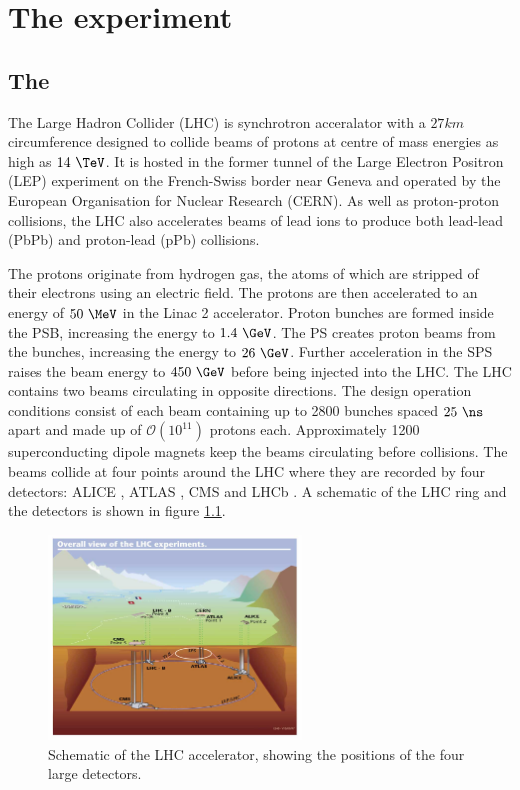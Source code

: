 \chapter{The \CMS experiment}
\label{chap:detector}

\section{The \LHC}
\label{sec:theLHC}

The Large Hadron Collider (LHC) \cite{theLHC} is synchrotron acceralator
with a $27 km$ circumference designed to
collide beams of protons at centre of mass energies as high as $14~\TeV$. It is
hosted in the former tunnel of the Large Electron Positron (LEP) \cite{LEP:1983aa} experiment on the French-Swiss border
near Geneva and operated by the European Organisation for Nuclear Research
(CERN). As well as proton-proton collisions, the LHC also accelerates beams of
lead ions to produce both lead-lead (PbPb) and proton-lead (pPb) collisions.

The protons originate from hydrogen gas, the atoms of which are stripped of
their electrons using an electric field. The protons are then accelerated to an
energy of $50~\MeV$ in the Linac 2 accelerator. Proton bunches are formed inside
the \ac{PSB}, increasing the energy to $1.4~\GeV$. The \ac{PS} creates proton
beams from the bunches, increasing the energy to $26~\GeV$. Further acceleration
in the \ac{SPS} raises the beam energy to $450~\GeV$ before being injected into
the LHC. The LHC contains two beams circulating in opposite directions. The
design operation conditions consist of each beam containing up to 2800 bunches
spaced $25~\ns$ apart and made up of $\mathcal{O}(10^{11})$ protons each. 
Approximately 1200 superconducting dipole magnets keep the beams circulating
before collisions. The beams collide at four points around the LHC where they
are recorded by four detectors: ALICE \cite{Aamodt:2008zz}, ATLAS
\cite{Aad:2008zzm}, CMS \cite{Chatrchyan:2008aa} and LHCb \cite{Alves:2008zz}. A
schematic of the LHC ring and the detectors is shown in figure
\ref{fig:LHCschematic}.

\begin{figure}[htbp]
   \includegraphics[width=0.6\textwidth]{plots/detector/LHC_layout_sch.jpg}
\caption{Schematic of the LHC accelerator, showing the positions of the four
large detectors.}
\label{fig:LHCschematic}
\end{figure}

